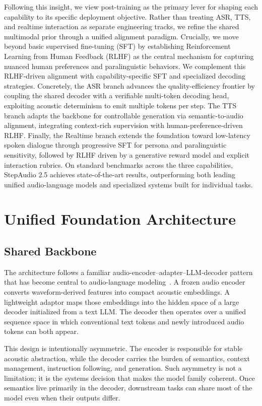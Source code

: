 \documentclass{llmxive}
\begin{document}
Following this insight, we view post-training as the primary lever for shaping each capability to its specific deployment objective. Rather than treating ASR, TTS, and realtime interaction as separate engineering tracks, we refine the shared multimodal prior through a unified alignment paradigm. Crucially, we move beyond basic supervised fine-tuning (SFT) by establishing Reinforcement Learning from Human Feedback (RLHF) as the central mechanism for capturing nuanced human preferences and paralinguistic behaviors. We complement this RLHF-driven alignment with capability-specific SFT and specialized decoding strategies. Concretely, the ASR branch advances the quality-efficiency frontier by coupling the shared decoder with a verifiable multi-token decoding head, exploiting acoustic determinism to emit multiple tokens per step. The TTS branch adapts the backbone for controllable generation via semantic-to-audio alignment, integrating context-rich supervision with human-preference-driven RLHF. Finally, the Realtime branch extends the foundation toward low-latency spoken dialogue through progressive SFT for persona and paralinguistic sensitivity, followed by RLHF driven by a generative reward model and explicit interaction rubrics. On standard benchmarks across the three capabilities, StepAudio 2.5 achieves state-of-the-art results, outperforming both leading unified audio-language models and specialized systems built for individual tasks.
\section{Unified Foundation Architecture}
\label{sec:architecture}

\subsection{Shared Backbone}

The architecture follows a familiar audio-encoder--adapter--LLM-decoder pattern that has become central to audio-language modeling~\citep{wu2025stepaudio2technicalreport,xu2025qwen3omnitechnicalreport}. A frozen audio encoder converts waveform-derived features into compact acoustic embeddings. A lightweight adaptor maps those embeddings into the hidden space of a large decoder initialized from a text LLM. The decoder then operates over a unified sequence space in which conventional text tokens and newly introduced audio tokens can both appear.

This design is intentionally asymmetric. The encoder is responsible for stable acoustic abstraction, while the decoder carries the burden of semantics, context management, instruction following, and generation. Such asymmetry is not a limitation; it is the systems decision that makes the model family coherent. Once semantics live primarily in the decoder, downstream tasks can share most of the model even when their outputs differ.
\end{document}
